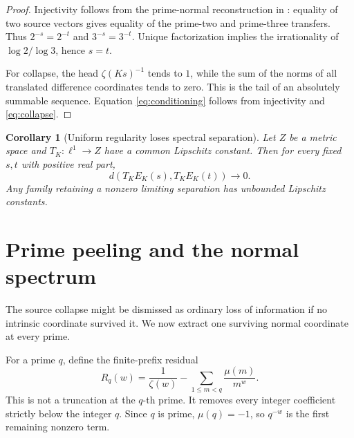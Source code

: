 \documentclass[11pt]{article}
\newtheorem{corollary}[theorem]{Corollary}
\theoremstyle{definition}
\theoremstyle{remark}
\begin{document}
\begin{proof}
Injectivity follows from the prime-normal reconstruction in
: equality of two source vectors gives equality of
the prime-two and prime-three transfers.  Thus
\(2^{-s}=2^{-t}\) and \(3^{-s}=3^{-t}\).  Unique factorization implies the
irrationality of \(\log2/\log3\), hence \(s=t\).

For collapse, the head \(\zeta(Ks)^{-1}\) tends to \(1\), while the sum of
the norms of all translated difference coordinates tends to zero.  This is
the tail of an absolutely summable sequence.  Equation
\eqref{eq:conditioning} follows from injectivity and
\eqref{eq:collapse}.
\end{proof}

\begin{corollary}[Uniform regularity loses spectral separation]
\label{cor:lipschitz}
Let \(Z\) be a metric space and \(T_K:\ell^1\to Z\) have a common Lipschitz
constant.  Then for every fixed \(s,t\) with positive real part,
\[
                 d(T_KE_K(s),T_KE_K(t))\longrightarrow0.
\tag{3.10}\label{eq:lipschitz-loss}
\]
Any family retaining a nonzero limiting separation has unbounded Lipschitz
constants.
\end{corollary}

\section{Prime peeling and the normal spectrum}
\label{sec:prime-peeling}

The source collapse might be dismissed as ordinary loss of information if
no intrinsic coordinate survived it.  We now extract one surviving normal
coordinate at every prime.

For a prime \(q\), define the finite-prefix residual
\[
 R_q(w)=\frac1{\zeta(w)}
          -\sum_{1\leq m<q}\frac{\mu(m)}{m^w}.
\tag{4.1}\label{eq:peeled-residual}
\]
This is not a truncation at the \(q\)-th prime.  It removes every integer
coefficient strictly below the integer \(q\).  Since \(q\) is prime,
\(\mu(q)=-1\), so \(q^{-w}\) is the first remaining nonzero term.
\end{document}

